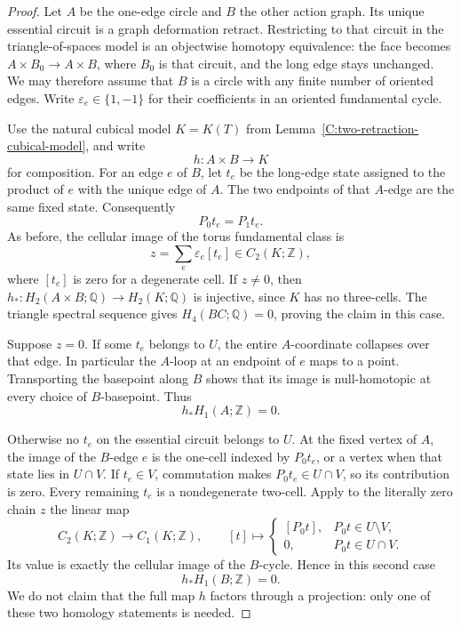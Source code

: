 \begin{proof}
Let $A$ be the one-edge circle and $B$ the other action graph.
Its unique essential circuit is a graph deformation retract.
Restricting to that circuit in the triangle-of-spaces model
is an objectwise homotopy equivalence: the face becomes
$A\times B_0\to A\times B$, where $B_0$ is that circuit,
and the long edge stays unchanged.  We may therefore assume
that $B$ is a circle with any finite number of oriented edges.
Write $\varepsilon_e\in\{1,-1\}$ for their coefficients in
an oriented fundamental cycle.

Use the natural cubical model $K=K(T)$ from
Lemma~\ref{C:two-retraction-cubical-model}, and write
\[
 h:A\times B\longrightarrow K
\]
for composition.  For an edge $e$ of $B$, let $t_e$ be the
long-edge state assigned to the product of $e$ with the unique
edge of $A$.  The two endpoints of that $A$-edge are the same
fixed state.  Consequently
\[
 P_0t_e=P_1t_e.
\]
As before, the cellular image of the torus fundamental class is
\[
 z=\sum_e\varepsilon_e[t_e]\in C_2(K;\mathbb Z),
\]
where $[t_e]$ is zero for a degenerate cell.  If $z\ne0$,
then $h_*:H_2(A\times B;\mathbb Q)\to H_2(K;\mathbb Q)$
is injective, since $K$ has no three-cells.  The triangle
spectral sequence gives $H_4(BC;\mathbb Q)=0$, proving the
claim in this case.

Suppose $z=0$.  If some $t_e$ belongs to $U$, the entire
$A$-coordinate collapses over that edge.  In particular the
$A$-loop at an endpoint of $e$ maps to a point.  Transporting
the basepoint along $B$ shows that its image is null-homotopic
at every choice of $B$-basepoint.  Thus
\begin{equation}\label{C:loop-chart-one-coordinate}
 h_*H_1(A;\mathbb Z)=0.
\end{equation}

Otherwise no $t_e$ on the essential circuit belongs to $U$.
At the fixed vertex of $A$, the image of the $B$-edge $e$
is the one-cell indexed by $P_0t_e$, or a vertex when that
state lies in $U\cap V$.  If $t_e\in V$, commutation makes
$P_0t_e\in U\cap V$, so its contribution is zero.  Every
remaining $t_e$ is a nondegenerate two-cell.  Apply to the
literally zero chain $z$ the linear map
\[
 C_2(K;\mathbb Z)\longrightarrow C_1(K;\mathbb Z),
 \qquad [t]\longmapsto
 \begin{cases}
 [P_0t],&P_0t\in U\setminus V,\\
 0,&P_0t\in U\cap V.
 \end{cases}
\]
Its value is exactly the cellular image of the $B$-cycle.
Hence in this second case
\begin{equation}\label{C:loop-chart-other-coordinate}
 h_*H_1(B;\mathbb Z)=0.
\end{equation}
We do not claim that the full map $h$ factors through a
projection: only one of these two homology statements is
needed.


\end{proof}
